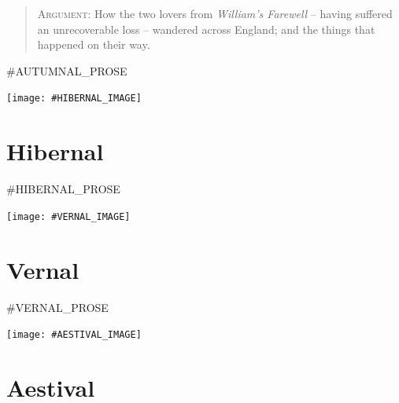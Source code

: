 \documentclass{amsbook}
\begin{document}
    \begin{quote}
        {\footnotesize \textsc{Argument:} How the two lovers from \textit{William's Farewell} -- having suffered an unrecoverable loss -- wandered across England; and the things that happened on their way.}
    \end{quote}
    \bigskip

    #AUTUMNAL_PROSE
    \clearpage

    \thispagestyle{empty}
    \vspace*{\fill}
    {\centering
    \texttt{[image: \#HIBERNAL\_IMAGE]}}
    \vspace*{\fill}
    \clearpage

    \chapter{Hibernal}

    \renewcommand{\poemone}{
        #HIBERNAL_POEM_1
    }
    \renewcommand{\poemtwo}{
        #HIBERNAL_POEM_2
    }
    \renewcommand{\poemthree}{
        #HIBERNAL_PRAYER
    }
    \initprintpoems

    #HIBERNAL_PROSE
    \clearpage

    \thispagestyle{empty}
    \vspace*{\fill}
    {\centering
    \texttt{[image: \#VERNAL\_IMAGE]}}
    \vspace*{\fill}
    \clearpage

    \chapter{Vernal}

    \renewcommand{\poemone}{
        #VERNAL_POEM_1
    }
    \renewcommand{\poemtwo}{
        #VERNAL_POEM_2
    }
    \renewcommand{\poemthree}{
        #VERNAL_PRAYER
    }
    \initprintpoems

    #VERNAL_PROSE
    \clearpage

    \thispagestyle{empty}
    \vspace*{\fill}
    {\centering
    \texttt{[image: \#AESTIVAL\_IMAGE]}}
    \vspace*{\fill}
    \clearpage

    \chapter{Aestival}

    \renewcommand{\poemone}{
        #AESTIVAL_POEM_1
    }
    \renewcommand{\poemtwo}{
        #AESTIVAL_POEM_2
    }
    \renewcommand{\poemthree}{
        #AESTIVAL_POEM_3
    }
    \initprintpoems
\end{document}

